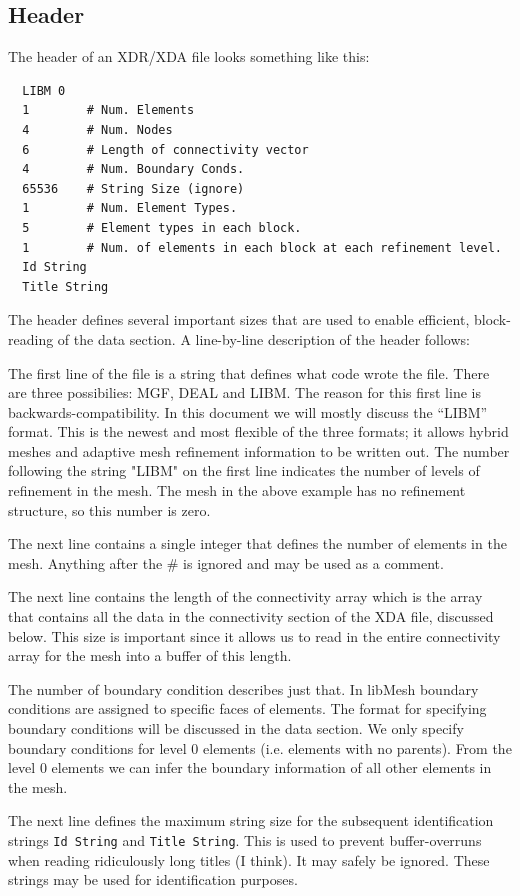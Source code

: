 \documentclass[12pt]{article}
\begin{document}
\subsection{Header}
The header of an XDR/XDA file looks something like this:
\small
\begin{verbatim}
  LIBM 0
  1        # Num. Elements
  4        # Num. Nodes
  6        # Length of connectivity vector
  4        # Num. Boundary Conds.
  65536    # String Size (ignore)
  1        # Num. Element Types.
  5        # Element types in each block.
  1        # Num. of elements in each block at each refinement level.
  Id String
  Title String
\end{verbatim}
\normalsize
The header defines several important sizes that are used to enable efficient, block-reading of the data section. A line-by-line description of the header follows:

The first line of the file is a string that defines what code wrote the file. There are three possibilies: MGF, DEAL and LIBM. The reason for this first line is backwards-compatibility. In this document we will mostly discuss the ``LIBM'' format. This is the newest and most flexible of the three formats; it allows hybrid meshes and adaptive mesh refinement information to be written out. The number following the string "LIBM" on the first line indicates the number of levels of refinement in the mesh. The mesh in the above example has no refinement structure, so this number is zero.

The next line contains a single integer that defines the number of elements in the mesh.  Anything after the \# is ignored and may be used as a comment.

The next line contains the length of the connectivity array which is the array that contains all the data in the connectivity section of the XDA file, discussed below. This size is important since it allows us to read in the entire connectivity array for the mesh into a buffer of this length.

The number of boundary condition describes just that.  In libMesh boundary conditions are assigned to specific faces of elements.  The format for specifying boundary conditions will be discussed in the data section. We only specify boundary conditions for level 0 elements (i.e. elements with no parents). From the level 0 elements we can infer the boundary information of all other elements in the mesh.

The next line defines the maximum string size for the subsequent identification strings \texttt{Id~String} and \texttt{Title~String}. This is used to prevent buffer-overruns when reading ridiculously long titles (I think).  It may safely be ignored.  These strings may be used for identification purposes.
\end{document}
